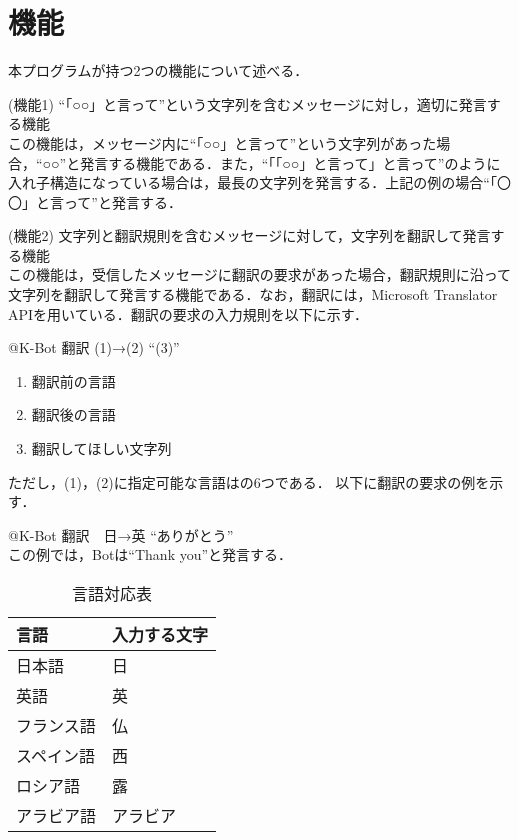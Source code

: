 \documentclass[fleqn, 14pt]{sty/extarticlej}
\begin{document}
\section{機能}
本プログラムが持つ2つの機能について述べる．
\begin{description}
\item{(機能1)} ``「○○」と言って''という文字列を含むメッセージに対し，適切に発言する機能\\
  この機能は，メッセージ内に``「○○」と言って''という文字列があった場合，``○○''と発言する機能である．また，``「「○○」と言って」と言って''のように入れ子構造になっている場合は，最長の文字列を発言する．上記の例の場合``「〇〇」と言って''と発言する．
\item{(機能2)} 文字列と翻訳規則を含むメッセージに対して，文字列を翻訳して発言する機能\\
  この機能は，受信したメッセージに翻訳の要求があった場合，翻訳規則に沿って文字列を翻訳して発言する機能である．なお，翻訳には，Microsoft Translator API\cite{translator}を用いている．翻訳の要求の入力規則を以下に示す．
  
  @K-Bot 翻訳 (1)→(2)  ``(3)''\\
  \begin{enumerate}
  \item 翻訳前の言語
  \item 翻訳後の言語
  \item 翻訳してほしい文字列
  \end{enumerate}
  ただし，(1)，(2)に指定可能な言語はの6つである．
  以下に翻訳の要求の例を示す．

  @K-Bot 翻訳　日→英 ``ありがとう''\\

  この例では，Botは``Thank you''と発言する．

  \begin{table}
    \begin{center}
      \caption{言語対応表} \label{tab:言語}
      \begin{tabular}{l|l}
        \hline\hline
        言語 & 入力する文字\\ \hline
        日本語 & 日\\
        英語 & 英\\
        フランス語 & 仏\\
        スペイン語 & 西\\
        ロシア語 & 露\\
        アラビア語 & アラビア\\
        \hline
      \end{tabular}
    \end{center}
  \end{table}
\end{description}
\end{document}
